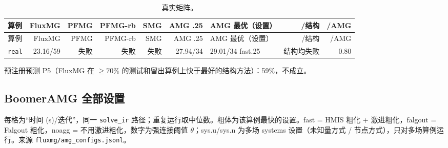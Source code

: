 {\scriptsize\setlength{\tabcolsep}{3pt}
\begin{longtable}{lrrrrrlrr}
\caption{真实矩阵。}\\
\toprule
算例 & FluxMG & PFMG & PFMG-rb & SMG & AMG .25 & AMG 最优（设置） & /结构 & /AMG \\
\midrule
\endfirsthead
\toprule
算例 & FluxMG & PFMG & PFMG-rb & SMG & AMG .25 & AMG 最优（设置） & /结构 & /AMG \\
\midrule
\endhead
\bottomrule
\endlastfoot
\texttt{real} & 23.16/59 & 失败 & 失败 & 失败 & 27.94/34 & 29.01/34 fast.25 & 结构均失败 & 0.80 \\
\end{longtable}}
预注册预测 P5（FluxMG 在 $\ge70\%$ 的测试和留出算例上快于最好的结构方法）：59\%，不成立。
\subsection{BoomerAMG 全部设置}
每格为“时间 (s)/迭代”，同一 \texttt{solve\_ir} 路径；重复运行取中位数。粗体为该算例最快的设置。fast = HMIS 粗化 + 激进粗化，falgout = Falgout 粗化，noagg = 不用激进粗化，数字为强连接阈值 $\theta$；sys.u/sys.n 为多场 systems 设置（未知量方式 / 节点方式），只对多场算例运行。来源 \texttt{fluxmg/amg\_configs.jsonl}。
